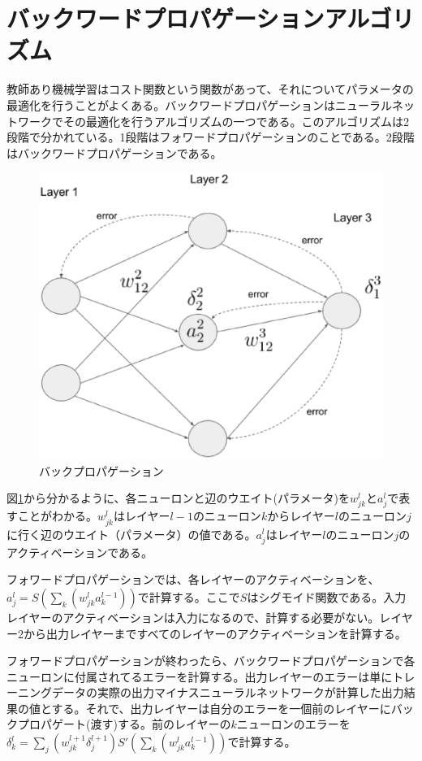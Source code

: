 \documentclass[]{iplresume} %
\begin{document}
\section{バックワードプロパゲーションアルゴリズム}
教師あり機械学習はコスト関数という関数があって、それについてパラメータの最適化を行うことがよくある。バックワードプロパゲーションはニューラルネットワークでその最適化を行うアルゴリズムの一つである。このアルゴリズムは2段階で分かれている。1段階はフォワードプロパゲーションのことである。2段階はバックワードプロパゲーションである。
\begin{figure}
\includegraphics[scale=0.3]{backward.eps}
\caption{バックプロパゲーション}
\label{backward}
\end{figure}

図\ref{backward}から分かるように、各ニューロンと辺のウエイト(パラメータ)を$w^l_{jk}$と$a^l_j$で表すことがわかる。$w^l_{jk}$はレイヤー$l-1$のニューロン$k$からレイヤー$l$のニューロン$j$に行く辺のウエイト（パラメータ）の値である。$a^l_j$はレイヤー$l$のニューロン$j$のアクティベーションである。

フォワードプロパゲーションでは、各レイヤーのアクティベーションを、$a^l_j = S(\displaystyle\sum_k(w^l_{jk}a^{l-1}_k))$で計算する。ここで$S$はシグモイド関数である。入力レイヤーのアクティベーションは入力になるので、計算する必要がない。レイヤー2から出力レイヤーまですべてのレイヤーのアクティベーションを計算する。

フォワードプロパゲーションが終わったら、バックワードプロパゲーションで各ニューロンに付属されてるエラーを計算する。出力レイヤーのエラーは単にトレーニングデータの実際の出力マイナスニューラルネットワークが計算した出力結果の値とする。それで、出力レイヤーは自分のエラーを一個前のレイヤーにバックプロパゲート(渡す)する。前のレイヤーの$k$ニューロンのエラーを$\delta^l_k = \displaystyle\sum_j(w^{l+1}_{jk}\delta^{l+1}_j)S'(\displaystyle\sum_k(w^l_{jk}a^{l-1}_k))$で計算する。
\end{document}
